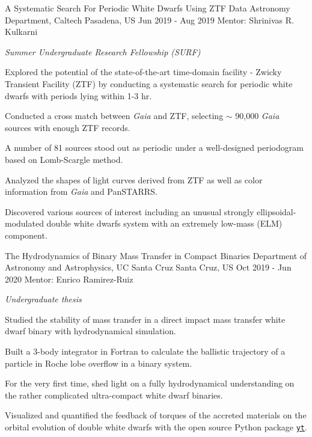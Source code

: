 \begin{cvexperiences}
\cvexperience
{A Systematic Search For Periodic White Dwarfs Using ZTF Data} %
{Astronomy Department, Caltech} %
{Pasadena, US} %
{Jun 2019 - Aug 2019} %
{Mentor: Shrinivas R. Kulkarni}
{ %
	\begin{cvitems}
		\item {\textit{Summer Undergraduate Research Fellowship (SURF)}}
		\item {Explored the potential of the state-of-the-art time-domain facility - Zwicky Transient Facility (ZTF) by conducting a systematic search for periodic white dwarfs with periods lying within 1-3 hr.}
		\item {Conducted a cross match between \textit{Gaia} and ZTF, selecting $\sim$ 90,000 \textit{Gaia} sources with enough ZTF records.}
		\item {A number of 81 sources stood out as periodic under a well-designed periodogram based on Lomb-Scargle method.}
		\item {Analyzed the shapes of light curves derived from ZTF as well as color information from \textit{Gaia} and PanSTARRS.}
		\item {Discovered various sources of interest including an unusual strongly ellipsoidal-modulated double white dwarfs system with an extremely low-mass (ELM) component.}
	\end{cvitems}
}

\cvexperience
{The Hydrodynamics of Binary Mass Transfer in Compact Binaries} %
{Department of Astronomy and Astrophysics, UC Santa Cruz} %
{Santa Cruz, US} %
{Oct 2019 - Jun 2020} %
{Mentor: Enrico Ramirez-Ruiz}
{ %
	\begin{cvitems}
		\item {\textit{Undergraduate thesis}}
		\item {Studied the stability of mass transfer in a direct impact mass transfer white dwarf binary with hydrodynamical simulation.}
		\item {Built a 3-body integrator in Fortran to calculate the ballistic trajectory of a particle in Roche lobe overflow in a binary system.}
		\item {For the very first time, shed light on a fully hydrodynamical understanding on the rather complicated ultra-compact white dwarf binaries.}
		\item {Visualized and quantified the feedback of torques of the accreted materials on the orbital evolution of double white dwarfs with the open source Python package \href{https://yt-project.org}{\texttt{yt}}.}
	\end{cvitems}
}


\end{cvexperiences}
